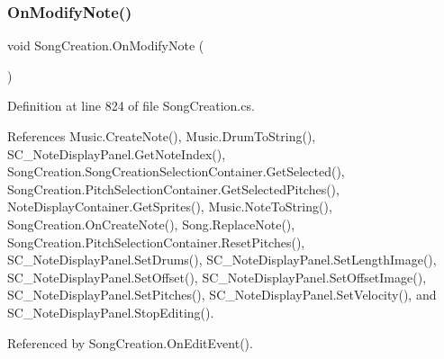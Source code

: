 \subsubsection{\texorpdfstring{On\+Modify\+Note()}{OnModifyNote()}}
{\footnotesize\ttfamily void Song\+Creation.\+On\+Modify\+Note (\begin{DoxyParamCaption}{ }\end{DoxyParamCaption})}



Definition at line 824 of file Song\+Creation.\+cs.



References Music.\+Create\+Note(), Music.\+Drum\+To\+String(), S\+C\+\_\+\+Note\+Display\+Panel.\+Get\+Note\+Index(), Song\+Creation.\+Song\+Creation\+Selection\+Container.\+Get\+Selected(), Song\+Creation.\+Pitch\+Selection\+Container.\+Get\+Selected\+Pitches(), Note\+Display\+Container.\+Get\+Sprites(), Music.\+Note\+To\+String(), Song\+Creation.\+On\+Create\+Note(), Song.\+Replace\+Note(), Song\+Creation.\+Pitch\+Selection\+Container.\+Reset\+Pitches(), S\+C\+\_\+\+Note\+Display\+Panel.\+Set\+Drums(), S\+C\+\_\+\+Note\+Display\+Panel.\+Set\+Length\+Image(), S\+C\+\_\+\+Note\+Display\+Panel.\+Set\+Offset(), S\+C\+\_\+\+Note\+Display\+Panel.\+Set\+Offset\+Image(), S\+C\+\_\+\+Note\+Display\+Panel.\+Set\+Pitches(), S\+C\+\_\+\+Note\+Display\+Panel.\+Set\+Velocity(), and S\+C\+\_\+\+Note\+Display\+Panel.\+Stop\+Editing().



Referenced by Song\+Creation.\+On\+Edit\+Event().


